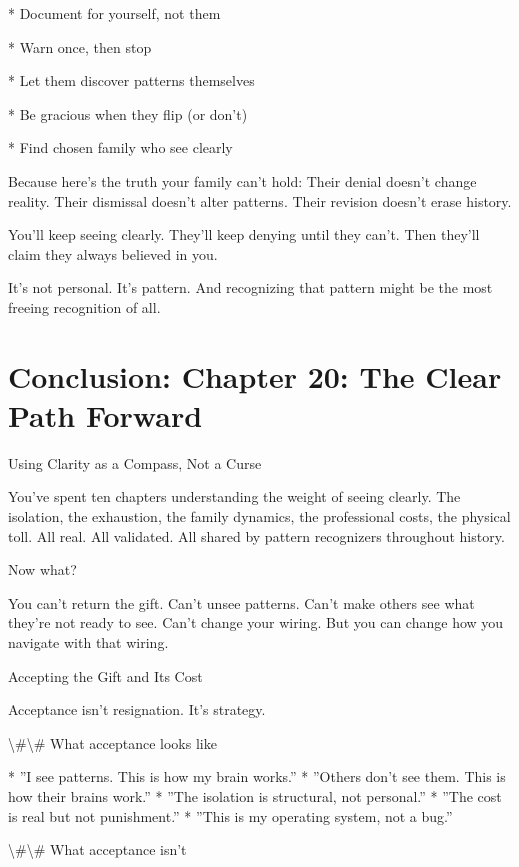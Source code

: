 \documentclass[12pt,oneside]{book}
\begin{document}
                    * Document for yourself, not them

                    * Warn once, then stop

                    * Let them discover patterns themselves

                    * Be gracious when they flip (or don't)

                    * Find chosen family who see clearly

Because here's the truth your family can't hold: Their denial doesn't change reality. Their dismissal doesn't alter patterns. Their revision doesn't erase history.

You'll keep seeing clearly. They'll keep denying until they can't. Then they'll claim they always believed in you.

It's not personal. It's pattern. And recognizing that pattern might be the most freeing recognition of all.

\chapter*{Conclusion: Chapter 20: The Clear Path Forward}

Using Clarity as a Compass, Not a Curse

You've spent ten chapters understanding the weight of seeing clearly. The isolation, the exhaustion, the family dynamics, the professional costs, the physical toll. All real. All validated. All shared by pattern recognizers throughout history.

Now what?

You can't return the gift. Can't unsee patterns. Can't make others see what they're not ready to see. Can't change your wiring. But you can change how you navigate with that wiring.

Accepting the Gift and Its Cost

Acceptance isn't resignation. It's strategy.

\textbackslash{}#\textbackslash{}# What acceptance looks like

                    * ''I see patterns. This is how my brain works.''
                    * ''Others don't see them. This is how their brains work.''
                    * ''The isolation is structural, not personal.''
                    * ''The cost is real but not punishment.''
                    * ''This is my operating system, not a bug.''

\textbackslash{}#\textbackslash{}# What acceptance isn't
\end{document}
